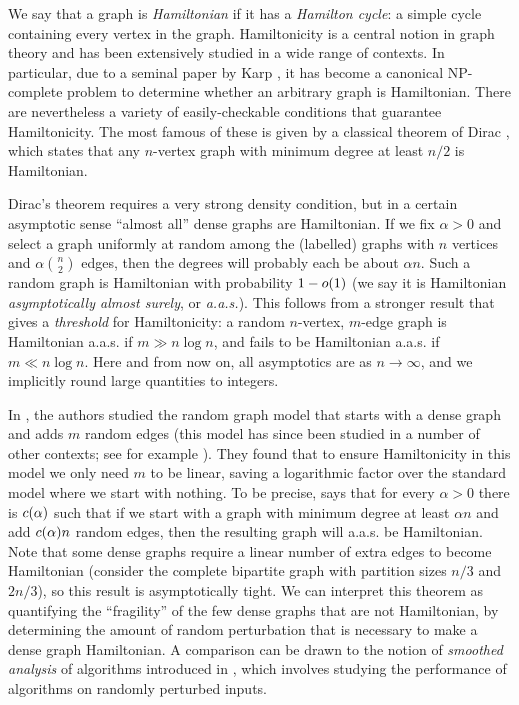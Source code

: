 \documentclass[11pt,english]{article}
\theoremstyle{plain}
\theoremstyle{definition}
\theoremstyle{definition}
\theoremstyle{plain}
\theoremstyle{plain}
\theoremstyle{plain}
\theoremstyle{plain}
\theoremstyle{remark}
\theoremstyle{remark}
\let\originalleft\left
\let\originalright\right
\renewcommand{\left}{\mathopen{}\mathclose\bgroup\originalleft}
\renewcommand{\right}{\aftergroup\egroup\originalright}
\begin{document}
We say that a graph is \emph{Hamiltonian} if it has a \emph{Hamilton
cycle}: a simple cycle containing every vertex in the graph. Hamiltonicity
is a central notion in graph theory and has been extensively studied
in a wide range of contexts. In particular, due to a seminal paper
by Karp \cite{Kar72}, it has become a canonical NP-complete problem
to determine whether an arbitrary graph is Hamiltonian. There are
nevertheless a variety of easily-checkable conditions that guarantee
Hamiltonicity. The most famous of these is given by a classical theorem
of Dirac \cite{Dir52}, which states that any $n$-vertex graph with
minimum degree at least $n/2$ is Hamiltonian.

Dirac's theorem requires a very strong density condition, but in a
certain asymptotic sense ``almost all'' dense graphs are Hamiltonian.
If we fix $\alpha>0$ and select a graph uniformly at random among
the (labelled) graphs with $n$ vertices and $\alpha{n \choose 2}$
edges, then the degrees will probably each be about $\alpha n$. Such
a random graph is Hamiltonian with probability $1-o\left(1\right)$
(we say it is Hamiltonian \emph{asymptotically almost surely}, or
\emph{a.a.s.}). This follows from a stronger result \cite{Pos76}
that gives a \emph{threshold} for Hamiltonicity: a random $n$-vertex,
$m$-edge graph is Hamiltonian a.a.s. if $m\gg n\log n$, and fails
to be Hamiltonian a.a.s. if $m\ll n\log n$. Here and from now on,
all asymptotics are as $n\to\infty$, and we implicitly round large
quantities to integers.

In \cite{BFM03}, the authors studied the random graph model that
starts with a dense graph and adds $m$ random edges (this model has
since been studied in a number of other contexts; see for example
\cite{BHM04,KST06}). They found that to ensure Hamiltonicity in this
model we only need $m$ to be linear, saving a logarithmic factor
over the standard model where we start with nothing. To be precise,
\cite[Theorem~1]{BFM03} says that for every $\alpha>0$ there is
$\cdi\left(\alpha\right)$ such that if we start with a graph with
minimum degree at least $\alpha n$ and add $\cdi\left(\alpha\right)n$
random edges, then the resulting graph will a.a.s. be Hamiltonian.
Note that some dense graphs require a linear number of extra edges
to become Hamiltonian (consider the complete bipartite graph with
partition sizes $n/3$ and $2n/3$), so this result is asymptotically
tight. We can interpret this theorem as quantifying the ``fragility''
of the few dense graphs that are not Hamiltonian, by determining the
amount of random perturbation that is necessary to make a dense graph
Hamiltonian. A comparison can be drawn to the notion of \emph{smoothed
analysis} of algorithms introduced in \cite{ST04}, which involves
studying the performance of algorithms on randomly perturbed inputs.
\end{document}
